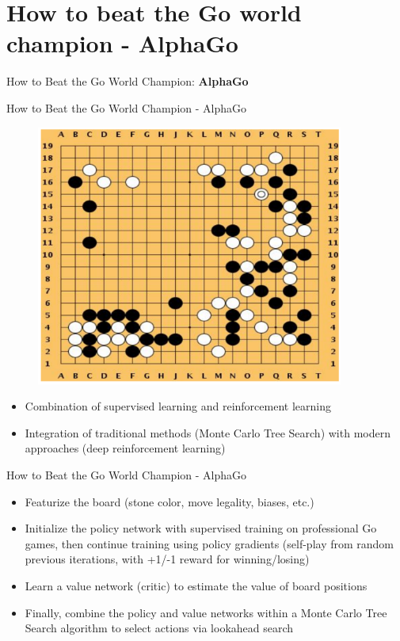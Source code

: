 \section{How to beat the Go world champion - AlphaGo}
\begin{frame}{}
    \LARGE How to Beat the Go World Champion: \textbf{AlphaGo}
\end{frame}

\begin{frame}{How to Beat the Go World Champion - AlphaGo}
\begin{figure}
\centering
\includegraphics[width=0.9\textwidth,height=0.6\textheight,keepaspectratio]{images/policygrad+reinforce+actor/alphago.png}
\end{figure}

\begin{itemize}
    \item Combination of supervised learning and reinforcement learning
    \item Integration of traditional methods (Monte Carlo Tree Search) with modern approaches (deep reinforcement learning)
\end{itemize}
\end{frame}

\begin{frame}{How to Beat the Go World Champion - AlphaGo}
\begin{itemize}
    \setlength{\itemsep}{1em}
    \large
    \item Featurize the board (stone color, move legality, biases, etc.)
    \item Initialize the policy network with supervised training on professional Go games, then continue training using policy gradients (self-play from random previous iterations, with +1/-1 reward for winning/losing)
    \item Learn a value network (critic) to estimate the value of board positions
    \item Finally, combine the policy and value networks within a Monte Carlo Tree Search algorithm to select actions via lookahead search
\end{itemize}
\end{frame}
